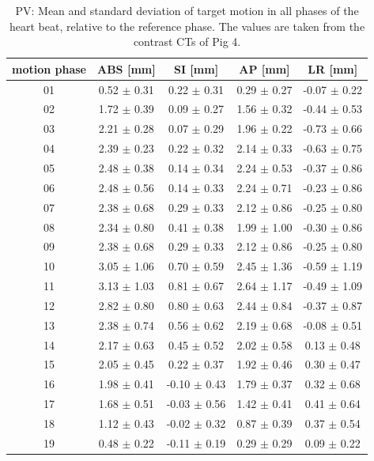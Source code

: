 \documentclass[type=dr, dr=rernat, accentcolor=tud7b,colorbacktitle, bigchapter, openright, twoside, 12pt ]{tudthesis}
\begin{document}
\newpage


\begin{table}[htbp]
  \centering
  \caption{PV: Mean and standard deviation of target motion in all phases of the heart beat, relative to the reference phase. The values are 
  taken from the contrast CTs of Pig 4.}
  \begin{tabular}{|c|c|c|c|c|}
    \hline\hline
    motion phase\rule{0pt}{2.6ex}\rule[-1.2ex]{0pt}{0pt} & ABS [mm] & SI [mm] & AP [mm] & LR [mm]\\
    \hline
01 &0.52 $\pm$ 0.31 &0.22 $\pm$ 0.31 &0.29 $\pm$ 0.27 &-0.07 $\pm$ 0.22 \\
02 &1.72 $\pm$ 0.39 &0.09 $\pm$ 0.27 &1.56 $\pm$ 0.32 &-0.44 $\pm$ 0.53 \\
03 &2.21 $\pm$ 0.28 &0.07 $\pm$ 0.29 &1.96 $\pm$ 0.22 &-0.73 $\pm$ 0.66 \\
04 &2.39 $\pm$ 0.23 &0.22 $\pm$ 0.32 &2.14 $\pm$ 0.33 &-0.63 $\pm$ 0.75 \\
05 &2.48 $\pm$ 0.38 &0.14 $\pm$ 0.34 &2.24 $\pm$ 0.53 &-0.37 $\pm$ 0.86 \\
06 &2.48 $\pm$ 0.56 &0.14 $\pm$ 0.33 &2.24 $\pm$ 0.71 &-0.23 $\pm$ 0.86 \\
07 &2.38 $\pm$ 0.68 &0.29 $\pm$ 0.33 &2.12 $\pm$ 0.86 &-0.25 $\pm$ 0.80 \\
08 &2.34 $\pm$ 0.80 &0.41 $\pm$ 0.38 &1.99 $\pm$ 1.00 &-0.30 $\pm$ 0.86 \\
09 &2.38 $\pm$ 0.68 &0.29 $\pm$ 0.33 &2.12 $\pm$ 0.86 &-0.25 $\pm$ 0.80 \\
10 &3.05 $\pm$ 1.06 &0.70 $\pm$ 0.59 &2.45 $\pm$ 1.36 &-0.59 $\pm$ 1.19 \\
11 &3.13 $\pm$ 1.03 &0.81 $\pm$ 0.67 &2.64 $\pm$ 1.17 &-0.49 $\pm$ 1.09 \\
12 &2.82 $\pm$ 0.80 &0.80 $\pm$ 0.63 &2.44 $\pm$ 0.84 &-0.37 $\pm$ 0.87 \\
13 &2.38 $\pm$ 0.74 &0.56 $\pm$ 0.62 &2.19 $\pm$ 0.68 &-0.08 $\pm$ 0.51 \\
14 &2.17 $\pm$ 0.63 &0.45 $\pm$ 0.52 &2.02 $\pm$ 0.58 &0.13 $\pm$ 0.48 \\
15 &2.05 $\pm$ 0.45 &0.22 $\pm$ 0.37 &1.92 $\pm$ 0.46 &0.30 $\pm$ 0.47 \\
16 &1.98 $\pm$ 0.41 &-0.10 $\pm$ 0.43 &1.79 $\pm$ 0.37 &0.32 $\pm$ 0.68 \\
17 &1.68 $\pm$ 0.51 &-0.03 $\pm$ 0.56 &1.42 $\pm$ 0.41 &0.41 $\pm$ 0.64 \\
18 &1.12 $\pm$ 0.43 &-0.02 $\pm$ 0.32 &0.87 $\pm$ 0.39 &0.37 $\pm$ 0.54 \\
19 &0.48 $\pm$ 0.22 &-0.11 $\pm$ 0.19 &0.29 $\pm$ 0.29 &0.09 $\pm$ 0.22 \\
    \hline\hline
  \end{tabular}
  \label{tab:motion:PV:Pig4}
\end{table}
\end{document}
